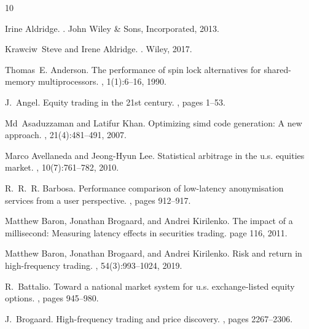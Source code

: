 \documentclass{article}
\theoremstyle{break}
\begin{document}

\begin{thebibliography}{10}

Irine Aldridge.
.
\newblock John Wiley \& Sons, Incorporated, 2013.

Krawciw~Steve and Irene Aldridge.
.
\newblock Wiley, 2017.

Thomas~E. Anderson.
\newblock The performance of spin lock alternatives for shared-memory multiprocessors.
, 1(1):6--16, 1990.

J.~Angel.
\newblock Equity trading in the 21st century.
, pages 1--53.

Md~Asaduzzaman and Latifur Khan.
\newblock Optimizing simd code generation: A new approach.
, 21(4):481--491, 2007.

Marco Avellaneda and Jeong-Hyun Lee.
\newblock Statistical arbitrage in the u.s. equities market.
, 10(7):761--782, 2010.

R.~R.~R. Barbosa.
\newblock Performance comparison of low-latency anonymisation services from a user perspective.
, pages 912--917.

Matthew Baron, Jonathan Brogaard, and Andrei Kirilenko.
\newblock The impact of a millisecond: Measuring latency effects in securities trading.
\newblock page 116, 2011.

Matthew Baron, Jonathan Brogaard, and Andrei Kirilenko.
\newblock Risk and return in high-frequency trading.
, 54(3):993--1024, 2019.

R.~Battalio.
\newblock Toward a national market system for u.s. exchange-listed equity options.
, pages 945--980.

J.~Brogaard.
\newblock High-frequency trading and price discovery.
, pages 2267--2306.


\end{thebibliography}
\end{document}
